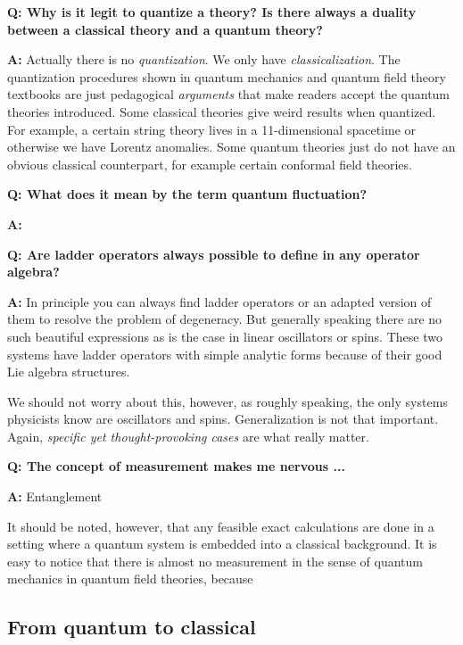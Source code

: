 \documentclass[hyperref, a4paper]{article}
\newcommand*{\concept}[1]{{\textbf{#1}}}
\newenvironment{qanda}{\setlength{\parindent}{0pt}}{\bigskip}
\newcommand{\Q}{\bigskip\bfseries Q: }
\newcommand{\A}{\par\textbf{A:} \normalfont}
\begin{document}
\begin{qanda}

\Q Why is it legit to quantize a theory? Is there always a duality between a classical theory and a quantum theory?
\A Actually there is no \emph{quantization}. We only have \emph{classicalization}. The quantization procedures shown in quantum mechanics and quantum field theory textbooks are just pedagogical \emph{arguments} that make readers accept the quantum theories introduced.
Some classical theories give weird results when quantized. For example, a certain string theory lives in a 11-dimensional spacetime or otherwise we have Lorentz anomalies.
Some quantum theories just do not have an obvious classical counterpart, for example certain conformal field theories.

\Q What does it mean by the term \concept{quantum fluctuation}?
\A 

\Q Are ladder operators always possible to define in any operator algebra?
\A In principle you can always find ladder operators or an adapted version of them to resolve the problem of degeneracy.
But generally speaking there are no such beautiful expressions as is the case in linear oscillators or spins.
These two systems have ladder operators with simple analytic forms because of their good Lie algebra structures.

We should not worry about this, however, as roughly speaking, the only systems physicists know are oscillators and spins.
Generalization is not that important. Again, \emph{specific yet thought-provoking cases} are what really matter.

\Q The concept of measurement makes me nervous ...
\A Entanglement

It should be noted, however, that any feasible exact calculations are done in a setting where a quantum system is embedded into a classical background.
It is easy to notice that there is almost no measurement in the sense of quantum mechanics in quantum field theories, because 

\end{qanda}

\subsection{From quantum to classical}
\end{document}
